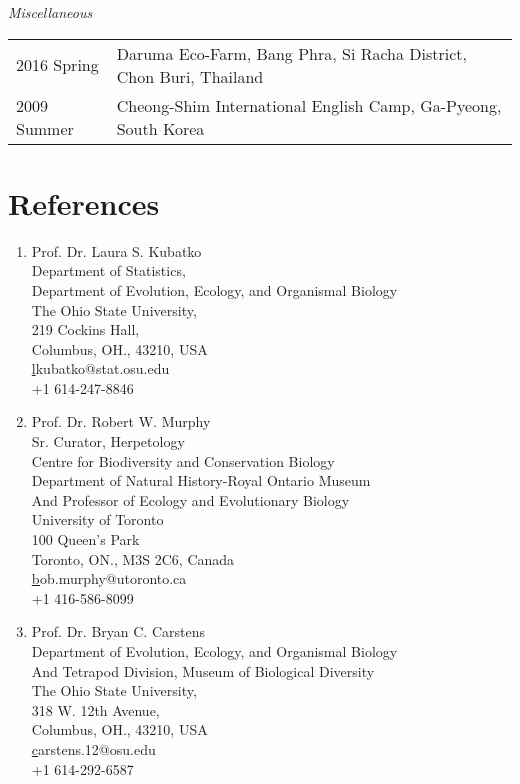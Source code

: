 \documentclass[11pt]{article}
\begin{document}
\textit{Miscellaneous}\\
\begin{longtable}{p{}  p{}}
2016 Spring & Daruma Eco-Farm, Bang Phra, Si Racha District, Chon Buri, Thailand\\
2009 Summer & Cheong-Shim International English Camp, Ga-Pyeong, South Korea\\
\end{longtable}
\hspace{0pt}


\pagebreak
\section*{References}

\begin{enumerate}

\item Prof. Dr. Laura S. Kubatko\\Department of Statistics,\\Department of Evolution, Ecology, and Organismal Biology\\The Ohio State University,\\219 Cockins Hall,\\Columbus, OH., 43210, USA\\\href{lkubatko@stat.osu.edu}lkubatko@stat.osu.edu\\+1 614-247-8846\\

\item Prof. Dr. Robert W. Murphy\\Sr. Curator, Herpetology\\Centre for Biodiversity and Conservation Biology\\Department of Natural History-Royal Ontario Museum\\And Professor of Ecology and Evolutionary Biology\\ University of Toronto\\100 Queen’s Park\\Toronto, ON., M3S 2C6, Canada\\\href{bob.murphy@utoronto.ca}bob.murphy@utoronto.ca\\+1 416-586-8099

\item Prof. Dr. Bryan C. Carstens\\ Department of Evolution, Ecology, and Organismal Biology\\ And Tetrapod Division, Museum of Biological Diversity\\The Ohio State University,\\318 W. 12th Avenue,\\Columbus, OH., 43210, USA\\\href{carstens.12@osu.edu}carstens.12@osu.edu\\+1 614-292-6587\\


\end{enumerate}
\end{document}
